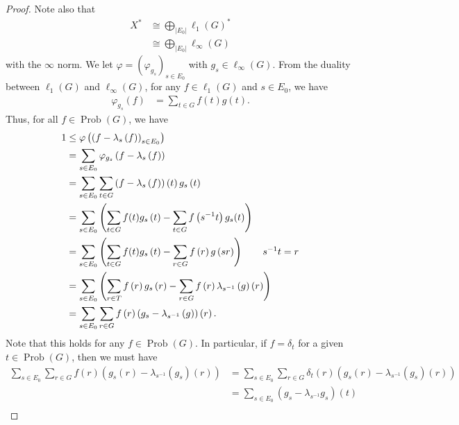 \documentclass[10pt]{mypackage}
\DeclareMathOperator{\Prob}{Prob}
\begin{document}
\begin{proof}
  Note also that
  \begin{align*}
    X^{\ast} &\cong \bigoplus_{\left\vert E_0 \right\vert}\ell_{1}\left(G\right)^{\ast}\\
             &\cong \bigoplus_{\left\vert E_0 \right\vert}\ell_{\infty}\left(G\right)
  \end{align*}
  with the $\infty$ norm. We let $\varphi = \left(\varphi_{g_s}\right)_{s\in E_0}$ with $g_s\in \ell_{\infty}\left(G\right)$. From the duality between $\ell_{1}\left(G\right)$ and $\ell_{\infty}\left(G\right)$, for any $f\in \ell_{1}\left(G\right)$ and $s\in E_0$, we have
  \begin{align*}
    \varphi_{g_s}\left(f\right) &= \sum_{t\in G}f(t)g(t).
  \end{align*}
  Thus, for all $f\in \Prob(G)$, we have
  \begin{align*}
    1 &\leq \varphi\left(\left(f-\lambda_s\left(f\right)\right)_{s\in E_0}\right)\\
      &= \sum_{s\in E_0}\varphi_{g_s}\left(f-\lambda_s\left(f\right)\right)\\
      &= \sum_{s\in E_0}\sum_{t\in G}\left(f-\lambda_s\left(f\right)\right)\left(t\right)g_s\left(t\right)\\
      &= \sum_{s\in E_0}\left(\sum_{t\in G}f(t)g_s\left(t\right) - \sum_{t\in G}f\left(s^{-1}t\right)g_s(t)\right)\\
      &= \sum_{s\in E_0}\left(\sum_{t\in G}f(t)g_s\left(t\right) - \sum_{r\in G}f\left(r\right)g\left(sr\right)\right) \tag*{$s^{-1}t = r$}\\
      &= \sum_{s\in E_0}\left(\sum_{r\in T}f\left(r\right)g_s\left(r\right) - \sum_{r\in G}f\left(r\right)\lambda_{s^{-1}}\left(g\right)\left(r\right)\right)\\
      &= \sum_{s\in E_0}\sum_{r\in G}f\left(r\right)\left(g_s-\lambda_{s^{-1}}\left(g\right)\right)\left(r\right).
  \end{align*}
  Note that this holds for any $f\in \Prob(G)$. In particular, if $f = \delta_t$ for a given $t\in \Prob(G)$, then we must have
  \begin{align*}
    \sum_{s\in E_0}\sum_{r\in G}f\left(r\right)\left(g_s\left(r\right) - \lambda_{s^{-1}}\left(g_s\right)\left(r\right)\right) &= \sum_{s\in E_0}\sum_{r\in G}\delta_t\left(r\right)\left(g_s\left(r\right) - \lambda_{s^{-1}}\left(g_s\right)\left(r\right)\right)\\
                                                                                                                               &= \sum_{s\in E_0}\left(g_s - \lambda_{s^{-1}}g_s\right)\left(t\right)\\

\end{align*}
\end{proof}
\end{document}
